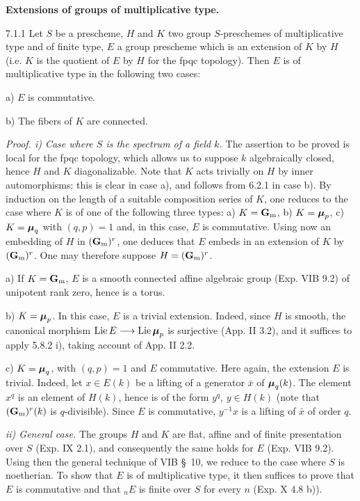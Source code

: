\label{XVII.7.1}\textbf{Extensions of groups of multiplicative type.}
\begin{proposition}{7.1.1}\label{XVII.7.1.1}
Let $S$ be a prescheme, $H$ and $K$ two group $S$-preschemes of multiplicative type and of finite type, $E$ a group prescheme which is an extension of $K$ by $H$ (i.e. $K$ is the quotient of $E$ by $H$ for the fpqc topology). Then $E$ is of multiplicative type in the following two cases:

\noindent a) $E$ is commutative.

\noindent b) The fibers of $K$ are connected.
\end{proposition}
\par\noindent\emph{Proof. i) Case where $S$ is the spectrum of a field $k$.}
The assertion to be proved is local for the fpqc topology, which allows us to suppose $k$ algebraically closed, hence $H$ and $K$ diagonalizable. Note that $K$ acts trivially on $H$ by inner automorphisms: this is clear in case a), and follows from 6.2.1 in case b). By induction on the length of a suitable composition series of $K$, one reduces to the case where $K$ is of one of the following three types: a) $K=\mathbf{G}_{\mathrm{m}}$, b) $K=\boldsymbol{\mu}_p$, c) $K=\boldsymbol{\mu}_q$ with $(q,p)=1$ and, in this case, $E$ is commutative. Using now an embedding of $H$ in $(\mathbf{G}_{\mathrm{m}})^r$, one deduces that $E$ embeds in an extension of $K$ by $(\mathbf{G}_{\mathrm{m}})^r$. One may therefore suppose $H=(\mathbf{G}_{\mathrm{m}})^r$.

\noindent a) If $K=\mathbf{G}_{\mathrm{m}}$, $E$ is a smooth connected affine algebraic group (Exp. VIB 9.2) of unipotent rank zero, hence is a torus.

\noindent b) $K=\boldsymbol{\mu}_p$. In this case, $E$ is a trivial extension. Indeed, since $H$ is smooth, the canonical morphism $\operatorname{Lie} E\longrightarrow\operatorname{Lie}\boldsymbol{\mu}_p$ is surjective (App. II 3.2), and it suffices to apply 5.8.2 i), taking account of App. II 2.2.

\noindent c) $K=\boldsymbol{\mu}_q$, with $(q,p)=1$ and $E$ commutative. Here again, the extension $E$ is trivial. Indeed, let $x\in E(k)$ be a lifting of a generator $\bar x$ of $\boldsymbol{\mu}_q(k)$. The element $x^q$ is an element of $H(k)$, hence is of the form $y^q$, $y\in H(k)$ (note that $(\mathbf{G}_{\mathrm{m}})^r(k)$ is $q$-divisible). Since $E$ is commutative, $y^{-1}x$ is a lifting of $\bar x$ of order $q$.

\par\noindent\emph{ii) General case.}
The groups $H$ and $K$ are flat, affine and of finite presentation over $S$ (Exp. IX 2.1), and consequently the same holds for $E$ (Exp. VIB 9.2). Using then the general technique of VIB \S\ 10, we reduce to the case where $S$ is noetherian. To show that $E$ is of multiplicative type, it then suffices to prove that $E$ is commutative and that ${}_nE$ is finite over $S$ for every $n$ (Exp. X 4.8 b)).

